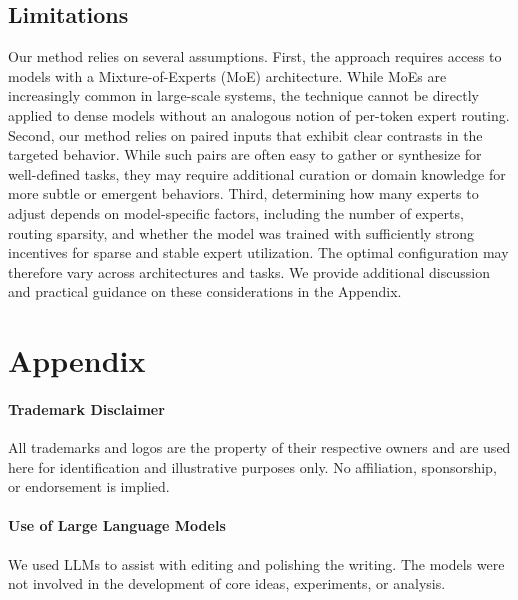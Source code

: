 \documentclass{article} %
\begin{document}
\subsection*{Limitations}
Our method relies on several assumptions. First, the approach requires access to models with a Mixture-of-Experts (MoE) architecture.  
While MoEs are increasingly common in large-scale systems, the technique cannot be directly applied to dense models without an analogous notion of per-token expert routing.
Second, our method relies on paired inputs that exhibit clear contrasts in the targeted behavior. While such pairs are often easy to gather or synthesize for well-defined tasks, they may require additional curation or domain knowledge for more subtle or emergent behaviors.
Third, determining how many experts to adjust depends on model-specific factors, including the number of experts, routing sparsity, and whether the model was trained with sufficiently strong incentives for sparse and stable expert utilization. The optimal configuration may therefore vary across architectures and tasks.
We provide additional discussion and practical guidance on these considerations in the Appendix.





\newpage

\appendix
{}
\section{Appendix}

\paragraph{Trademark Disclaimer} All trademarks and logos are the property of their respective owners and are used here for identification and illustrative purposes only. No affiliation, sponsorship, or endorsement is implied.

\paragraph{Use of Large Language Models} We used LLMs to assist with editing and polishing the writing. The models were not involved in the development of core ideas, experiments, or analysis.
\end{document}

